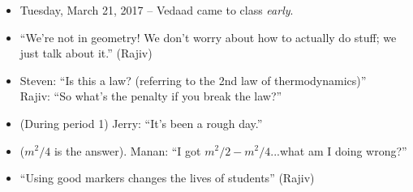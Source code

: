 \documentclass[11pt]{article}
\theoremstyle{definition}
\begin{document}
\begin{itemize}
\item Tuesday, March 21, 2017 -- Vedaad came to class \textit{early}.
\item ``We're not in geometry! We don't worry about how to actually do stuff; we just talk about it.'' (Rajiv)
\item Steven: ``Is this a law? (referring to the 2nd law of thermodynamics)'' \\ Rajiv: ``So what's the penalty if you break the law?''
\item (During period 1) Jerry: ``It's been a rough day.'' 
\item ($m^2/4$ is the answer). Manan: ``I got $m^2/2 - m^2/4$...what am I doing wrong?''
\item ``Using good markers changes the lives of students'' (Rajiv)
\end{itemize}
\end{document}
